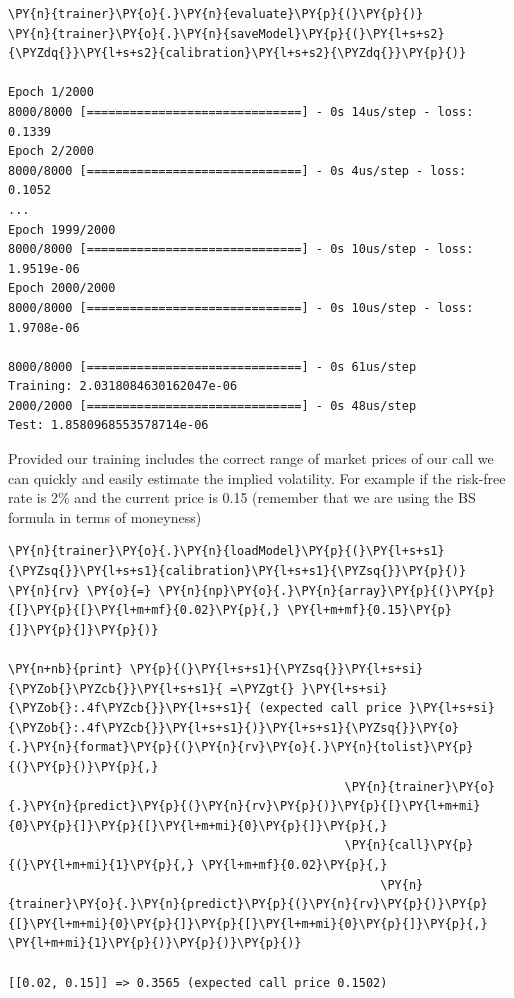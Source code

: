 \begin{codebox}[breakable, size=fbox, boxrule=1pt, pad at break*=1mm,colback=cellbackground, colframe=cellborder]
\begin{Verbatim}[commandchars=\\\{\}]
\PY{n}{trainer}\PY{o}{.}\PY{n}{evaluate}\PY{p}{(}\PY{p}{)}
\PY{n}{trainer}\PY{o}{.}\PY{n}{saveModel}\PY{p}{(}\PY{l+s+s2}{\PYZdq{}}\PY{l+s+s2}{calibration}\PY{l+s+s2}{\PYZdq{}}\PY{p}{)}

Epoch 1/2000
8000/8000 [==============================] - 0s 14us/step - loss: 0.1339
Epoch 2/2000
8000/8000 [==============================] - 0s 4us/step - loss: 0.1052
...
Epoch 1999/2000
8000/8000 [==============================] - 0s 10us/step - loss: 1.9519e-06
Epoch 2000/2000
8000/8000 [==============================] - 0s 10us/step - loss: 1.9708e-06

8000/8000 [==============================] - 0s 61us/step
Training: 2.0318084630162047e-06
2000/2000 [==============================] - 0s 48us/step
Test: 1.8580968553578714e-06
\end{Verbatim}
\end{codebox}

Provided our training includes the correct range of market prices of our
call we can quickly and easily estimate the implied volatility. For
example if the risk-free rate is 2\% and the current price is 0.15
(remember that we are using the BS formula in terms of moneyness)

\begin{codebox}[breakable, size=fbox, boxrule=1pt, pad at break*=1mm,colback=cellbackground, colframe=cellborder]
\begin{Verbatim}[commandchars=\\\{\}]
\PY{n}{trainer}\PY{o}{.}\PY{n}{loadModel}\PY{p}{(}\PY{l+s+s1}{\PYZsq{}}\PY{l+s+s1}{calibration}\PY{l+s+s1}{\PYZsq{}}\PY{p}{)}
\PY{n}{rv} \PY{o}{=} \PY{n}{np}\PY{o}{.}\PY{n}{array}\PY{p}{(}\PY{p}{[}\PY{p}{[}\PY{l+m+mf}{0.02}\PY{p}{,} \PY{l+m+mf}{0.15}\PY{p}{]}\PY{p}{]}\PY{p}{)}
	
\PY{n+nb}{print} \PY{p}{(}\PY{l+s+s1}{\PYZsq{}}\PY{l+s+si}{\PYZob{}\PYZcb{}}\PY{l+s+s1}{ =\PYZgt{} }\PY{l+s+si}{\PYZob{}:.4f\PYZcb{}}\PY{l+s+s1}{ (expected call price }\PY{l+s+si}{\PYZob{}:.4f\PYZcb{}}\PY{l+s+s1}{)}\PY{l+s+s1}{\PYZsq{}}\PY{o}{.}\PY{n}{format}\PY{p}{(}\PY{n}{rv}\PY{o}{.}\PY{n}{tolist}\PY{p}{(}\PY{p}{)}\PY{p}{,} 
                                               \PY{n}{trainer}\PY{o}{.}\PY{n}{predict}\PY{p}{(}\PY{n}{rv}\PY{p}{)}\PY{p}{[}\PY{l+m+mi}{0}\PY{p}{]}\PY{p}{[}\PY{l+m+mi}{0}\PY{p}{]}\PY{p}{,} 
                                               \PY{n}{call}\PY{p}{(}\PY{l+m+mi}{1}\PY{p}{,} \PY{l+m+mf}{0.02}\PY{p}{,} 
                                                    \PY{n}{trainer}\PY{o}{.}\PY{n}{predict}\PY{p}{(}\PY{n}{rv}\PY{p}{)}\PY{p}{[}\PY{l+m+mi}{0}\PY{p}{]}\PY{p}{[}\PY{l+m+mi}{0}\PY{p}{]}\PY{p}{,} \PY{l+m+mi}{1}\PY{p}{)}\PY{p}{)}\PY{p}{)}

[[0.02, 0.15]] => 0.3565 (expected call price 0.1502)
\end{Verbatim}
\end{codebox}

